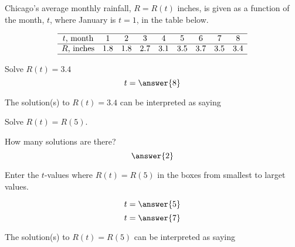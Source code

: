 \documentclass{ximera}
\author{}
\begin{document}
\licenseAPC



Chicago's average monthly rainfall, $R=R(t)$ inches, is given as a function of the month, $t$, where January is $t=1$, in the table below.


$$
\begin{array}{c c c c c c c c c}
\hline t \text{, month} & 1 & 2 & 3 & 4 & 5 & 6 & 7 & 8\\
\hline R \text{, inches} & 1.8 & 1.8 & 2.7 & 3.1 & 3.5 & 3.7 & 3.5 & 3.4\\
\hline
\end{array}
$$


\begin{exercise}
Solve $R(t)=3.4$
$$t=\answer{8}$$
\end{exercise}

\begin{exercise}
The solution(s) to $R(t)=3.4$ can be interpreted as saying
\begin{multipleChoice}
\end{multipleChoice}
\end{exercise}

\begin{exercise}
Solve $R(t)=R(5)$.

How many solutions are there? $$\answer{2}$$
\end{exercise}

\begin{exercise}
Enter the $t$-values where $R(t)=R(5)$ in the boxes from smallest to larget values.

$$t=\answer{5}$$
$$t=\answer{7}$$
\end{exercise}

\begin{exercise}
The solution(s) to $R(t)=R(5)$ can be interpreted as saying
\begin{multipleChoice}
\end{multipleChoice}
\end{exercise}
\end{document}
